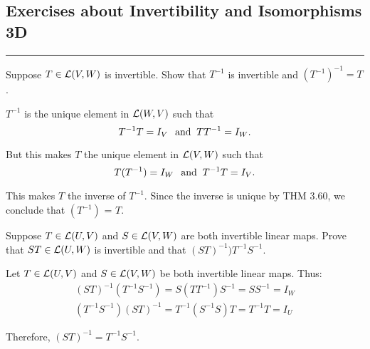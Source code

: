 \subsection*{Exercises about Invertibility and Isomorphisms 3D}
\hrule
\phantom{.}

\begin{xrcs}
  Suppose $T \in \mathcal{L}(V,W)$ is invertible. Show that $T^{-1}$ is invertible and $(T^{-1})^{-1} = T$.

  \begin{xprf}
    $T^{-1}$ is the unique element in $\mathcal{L}(W,V)$ such that
    \begin{equation}
      T^{-1} T = I_V \;\;\, \text{and}\;\; TT^{-1} = I_W.
    \end{equation}

    But this makes $T$ the unique element in $\mathcal{L}(V,W)$ such that
    \begin{equation}
      T(T^{-1}) = I_W \;\;\, \text{and}\;\; T^{-1} T = I_V.
    \end{equation}

    This makes $T$ the inverse of $T^{-1}$. Since the inverse is unique by THM 3.60, we conclude that $(T^{-1})$ = $T$.
  \end{xprf}
\end{xrcs}

\begin{xrcs}
  Suppose $T \in \mathcal{L}(U,V)$ and $S \in \mathcal{L}(V,W)$ are both invertible linear maps. Prove that $ST \in \mathcal{L}(U,W)$ is invertible and that $(ST)^{-1} ) T^{-1} S^{-1}$.

  \begin{xprf}
    Let $T \in \mathcal{L}(U,V)$ and $S \in \mathcal{L}(V,W)$ be both invertible linear maps. Thus:
    \begin{equation}
      \begin{aligned}
        (ST)^{-1} (T^{-1} S^{-1}) = S (T T^{-1}) S^{-1}
                                  = S S^{-1}
                                  = I_W \\
        (T^{-1} S^{-1}) (ST)^{-1} = T^{-1} (S^{-1} S) T
                                  = T^{-1} T
                                  = I_U
      \end{aligned}
    \end{equation}

    Therefore, $(ST)^{-1} = T^{-1} S^{-1}$.
  \end{xprf}
\end{xrcs}


